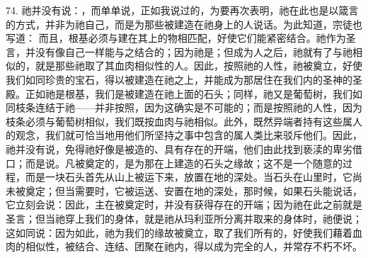 74. 祂并没有说：，而单单说，正如我说过的，为要再次表明，祂在此也是以箴言的方式，并非为祂自己，而是为那些被建造在祂身上的人说话。为此知道，宗徒也写道： 而且，根基必须与建在其上的物相匹配，好使它们能紧密结合。祂作为圣言，并没有像自己一样能与之结合的；因为祂是；但成为人之后，祂就有了与祂相似的，就是那些祂取了其血肉相似性的人。因此，按照祂的人性，祂被奠立，好使我们如同珍贵的宝石，得以被建造在祂之上，并能成为那居住在我们内的圣神的圣殿。正如祂是根基，我们是被建造在祂上面的石头；同样，祂又是葡萄树，我们如同枝条连结于祂——并非按照，因为这确实是不可能的；而是按照祂的人性，因为枝条必须与葡萄树相似，我们既按血肉与祂相似。此外，既然异端者持有这些属人的观念，我们就可恰当地用他们所坚持之事中包含的属人类比来驳斥他们。因此，祂并没有说，免得祂好像是被造的、具有存在的开端，他们由此找到亵渎的卑劣借口；而是说。凡被奠定的，是为那在上建造的石头之缘故；这不是一个随意的过程，而是一块石头首先从山上被运下来，放置在地的深处。当石头在山里时，它尚未被奠定；但当需要时，它被运送、安置在地的深处，那时候，如果石头能说话，它立刻会说：因此，主在被奠定时，并没有获得存在的开端；因为祂在此之前就是圣言；但当祂穿上我们的身体，就是祂从玛利亚所分离并取来的身体时，祂便说；这如同说：因为如此，祂为我们的缘故被奠立，取了我们所有的，好使我们藉着血肉的相似性，被结合、连结、团聚在祂内，得以成为完全的人，并常存不朽不坏。\par

